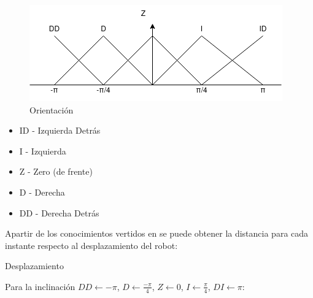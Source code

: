 \documentclass[oneside,onecolumn]{article}
\begin{document}
\begin{figure}[h]
  \centering
  \includegraphics[scale=0.7]{graficos/fuzzy_orientacion.png}
  \caption{Orientación}
\end{figure}

\begin{itemize}
\item ID - Izquierda Detrás
\item I - Izquierda
\item Z - Zero (de frente)
\item D - Derecha
\item DD - Derecha Detrás
\end{itemize}

Apartir de los conocimientos vertidos en se puede obtener la distancia para cada instante respecto al desplazamiento del robot:


\begin{algorithm}[H]
\caption{Desplazamiento}\label{alg:one}
\end{algorithm}


Para la inclinación $DD \gets -\pi$, $D \gets \frac{-\pi}{4}$, $Z \gets 0$, $I \gets \frac{\pi}{4}$, $DI \gets \pi$:
\end{document}
